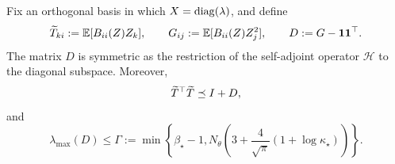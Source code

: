 \begin{lemma}
\label{lem:linear-diagonal-bounds}
Fix an orthogonal basis in which $X=\operatorname{diag}(\lambda)$, and define
\[
    \widetilde T_{ki}:=\mathbb{E}[B_{ii}(Z)Z_k],
    \qquad
    G_{ij}:=\mathbb{E}[B_{ii}(Z)Z_j^2],
    \qquad
    D:=G-\mathbf 1\mathbf 1^\top .
\]
The matrix $D$ is symmetric as the restriction of the self-adjoint operator $\mathcal H$ to
the diagonal subspace.  Moreover,
\begin{equation}
\label{eq:T-Schur}
    \widetilde T^\top\widetilde T\preceq I+D,
\end{equation}
and
\begin{equation}
\label{eq:D-Gamma}
    \lambda_{\max}(D)\leq
    \Gamma
    :=\min\left\{
        \beta_\star-1,
        N_\theta\left(3+\frac4{\sqrt\pi}(1+\log\kappa_\star)\right)
    \right\}.
\end{equation}
\end{lemma}

